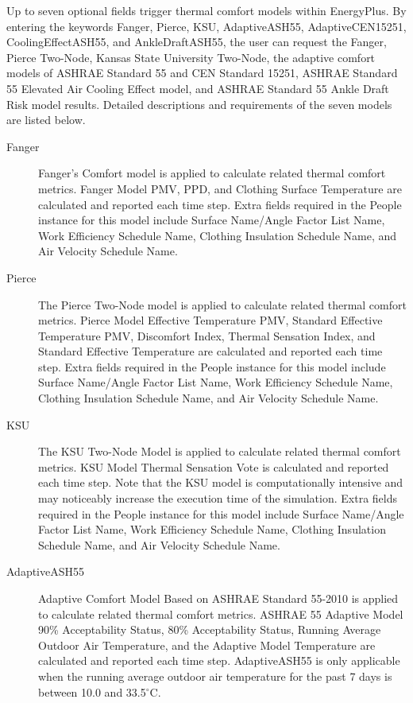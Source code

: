 Up to seven optional fields trigger thermal comfort models within EnergyPlus. By entering the keywords Fanger, Pierce, KSU, AdaptiveASH55, AdaptiveCEN15251, CoolingEffectASH55, and AnkleDraftASH55, the user can request the Fanger, Pierce Two-Node, Kansas State University Two-Node, the adaptive comfort models of ASHRAE Standard 55 and CEN Standard 15251, ASHRAE Standard 55 Elevated Air Cooling Effect model, and ASHRAE Standard 55 Ankle Draft Risk model results. Detailed descriptions and requirements of the seven models are listed below.

\begin{description}
  \item[Fanger]
  Fanger’s Comfort model is applied to calculate related thermal comfort metrics. Fanger Model PMV, PPD, and Clothing Surface Temperature are calculated and reported each time step. Extra fields required in the People instance for this model include Surface Name/Angle Factor List Name, Work Efficiency Schedule Name, Clothing Insulation Schedule Name, and Air Velocity Schedule Name.

  \item[Pierce]
  The Pierce Two-Node model is applied to calculate related thermal comfort metrics. Pierce Model Effective Temperature PMV, Standard Effective Temperature PMV, Discomfort Index, Thermal Sensation Index, and Standard Effective Temperature are calculated and reported each time step. Extra fields required in the People instance for this model include Surface Name/Angle Factor List Name, Work Efficiency Schedule Name, Clothing Insulation Schedule Name, and Air Velocity Schedule Name.

  \item[KSU]
  The KSU Two-Node Model is applied to calculate related thermal comfort metrics. KSU Model Thermal Sensation Vote is calculated and reported each time step. Note that the KSU model is computationally intensive and may noticeably increase the execution time of the simulation. Extra fields required in the People instance for this model include Surface Name/Angle Factor List Name, Work Efficiency Schedule Name, Clothing Insulation Schedule Name, and Air Velocity Schedule Name.

  \item[AdaptiveASH55]
  Adaptive Comfort Model Based on ASHRAE Standard 55-2010 is applied to calculate related thermal comfort metrics. ASHRAE 55 Adaptive Model 90\% Acceptability Status, 80\% Acceptability Status, Running Average Outdoor Air Temperature, and the Adaptive Model Temperature are calculated and reported each time step. AdaptiveASH55 is only applicable when the running average outdoor air temperature for the past 7 days is between 10.0 and 33.5$^\circ$C.


\end{description}
